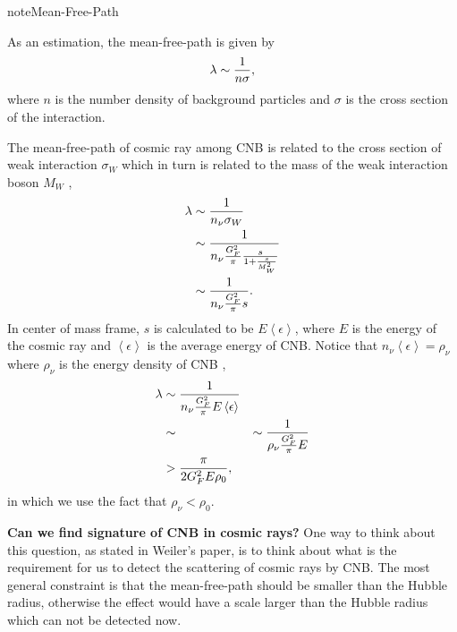 \documentclass[letterpaper,12pt,english]{sphinxmanual}
\begin{document}
\begin{notice}{note}{Mean-Free-Path}

As an estimation, the mean-free-path is given by
\begin{gather}
\begin{split}\lambda \sim \frac{1}{n \sigma},\end{split}\notag
\end{gather}
where \(n\) is the number density of background particles and \(\sigma\) is the cross section of the interaction.

The mean-free-path of cosmic ray among CNB is related to the cross section of weak interaction \(\sigma_W\) which in turn is related to the mass of the weak interaction boson \(M_W\) ,
\begin{gather}
\begin{split}\lambda &\sim \frac{1}{n_{\nu}\sigma_W} \\
& \sim \frac{1}{n_{\nu} \frac{G_F^2}{\pi} \frac{s}{1+\frac{s}{M_W^2}} }\\
& \sim \frac{1}{n_{\nu} \frac{G_F^2}{\pi} s }.\end{split}\notag
\end{gather}
In center of mass frame, \(s\) is calculated to be \(E\left\langle \epsilon \right\rangle\), where \(E\) is the energy of the cosmic ray and \(\left\langle \epsilon \right\rangle\) is the average energy of CNB. Notice that \(n_{\nu} \left\langle \epsilon \right\rangle = \rho_{\nu}\) where \(\rho_{\nu}\) is the energy density of CNB \footnotemark[6] ,
\begin{gather}
\begin{split}\lambda &\sim \frac{1}{n_{\nu} \frac{G_F^2}{\pi} E\left\langle \epsilon \right\rangle }\\
& \sim &\sim \frac{1}{\rho_{\nu} \frac{G_F^2}{\pi} E }\\
& > \frac{\pi}{ 2G_F^2 E\rho_0},\end{split}\notag
\end{gather}
in which we use the fact that \(\rho_{\nu} < \rho_0\).
\end{notice}

\textbf{Can we find signature of CNB in cosmic rays?} One way to think about this question, as stated in Weiler's paper, is to think about what is the requirement for us to detect the scattering of cosmic rays by CNB. The most general constraint is that the mean-free-path should be smaller than the Hubble radius, otherwise the effect would have a scale larger than the Hubble radius which can not be detected now.
\end{document}
